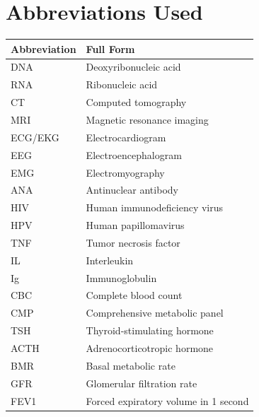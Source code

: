 \documentclass[12pt,a4paper,twoside]{book}
\begin{document}
\chapter*{Abbreviations Used}
\noindent
\begin{tabularx}{\textwidth}{lX}
\toprule
\textbf{Abbreviation} & \textbf{Full Form} \\
\midrule
DNA  & Deoxyribonucleic acid \\
RNA  & Ribonucleic acid \\
CT   & Computed tomography \\
MRI  & Magnetic resonance imaging \\
ECG/EKG & Electrocardiogram \\
EEG  & Electroencephalogram \\
EMG  & Electromyography \\
ANA  & Antinuclear antibody \\
HIV  & Human immunodeficiency virus \\
HPV  & Human papillomavirus \\
TNF  & Tumor necrosis factor \\
IL   & Interleukin \\
Ig   & Immunoglobulin \\
CBC  & Complete blood count \\
CMP  & Comprehensive metabolic panel \\
TSH  & Thyroid-stimulating hormone \\
ACTH & Adrenocorticotropic hormone \\
BMR  & Basal metabolic rate \\
GFR  & Glomerular filtration rate \\
FEV1 & Forced expiratory volume in 1 second \\
\bottomrule
\end{tabularx}
\end{document}

